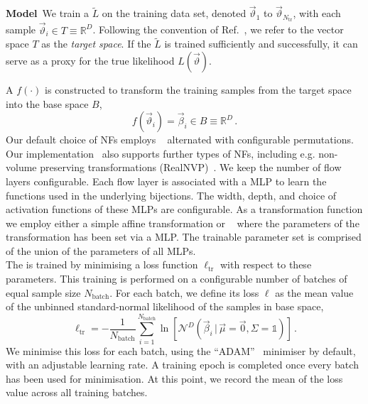 \documentclass[aps,nofootinbib,superscriptaddress,reprint,preprintnumbers]{revtex4-1}
\begin{document}
\noindent
\textbf{Model}~We train a \LM $\tilde{L}$ on the training data set, denoted $\vec{\vartheta}_1$ to $\vec{\vartheta}_{N_\text{tr}}$,
with each sample \mbox{$\vec{\vartheta}_i \in T \equiv \mathbb{R}^D$}.
Following the convention of Ref.~\cite{Beck:2023xou}, we refer to the vector space $T$ as the \emph{target space}.
If the \LM $\tilde{L}$ is trained sufficiently and successfully, it can serve as a proxy for the true likelihood $L(\vec{\vartheta})$.

A \NF $f(\cdot)$ is constructed to transform the training samples from the target space into the base space $B$,
\begin{equation}
    f(\vec\vartheta_i) = \vec\beta_i \in B \equiv \mathbb{R}^D\,.
\end{equation}
Our default choice of \acp{NF} employs \MAF~\cite{Papamakarios:2017tec} alternated with
configurable permutations. Our implementation~\cite{NABU:Software} also supports further types of \acp{NF},
including e.g. non-volume preserving transformations (RealNVP)~\cite{Dinh:2016pgf}.
We keep the number of flow layers configurable.
Each flow layer is associated with a \ac{MLP} to learn the functions used in the underlying bijections.
The width, depth, and choice of activation functions of these \acp{MLP} are configurable. As a transformation function we employ either a simple affine transformation or \RQS~\cite{durkan2019neuralsplineflows} where the parameters of the transformation has been set via a \ac{MLP}.
The trainable parameter set is comprised of the union of the parameters of all \acp{MLP}.\\



The \LM is trained by minimising a loss function $\ell_\text{tr}$ with respect to these parameters.
This training is performed on a configurable number of batches of equal sample size $N_\text{batch}$. For each batch,
we define its loss $\ell$ as the mean value of the unbinned standard-normal likelihood of the samples in base space,
\begin{equation}
    \ell_\text{tr} = -\frac{1}{N_\text{batch}}\sum_{i=1}^{N_\text{batch}} \ln \left[\mathcal{N}^D(\vec\beta_i \,|\, \vec{\mu} = \vec{0}, \Sigma = \mathds{1})\right]\,.
\end{equation}
We minimise this loss for each batch, using the ``ADAM''~\cite{Kingma:2014vow} minimiser by default, with an adjustable learning rate.
A training epoch is completed once every batch has been used for minimisation.
At this point, we record the mean of the loss value across all training batches.\\
\end{document}
